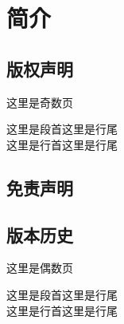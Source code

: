 \chapter{简介}
	\section{版权声明}
	这里是奇数页\par
	这里是段首\hfill 这里是行尾\\
	这里是行首\hfill 这里是行尾\\
	\section{免责声明}
	\newpage
	\section{版本历史}
	这里是偶数页\par
	这里是段首\hfill 这里是行尾\\
	这里是行首\hfill 这里是行尾\\